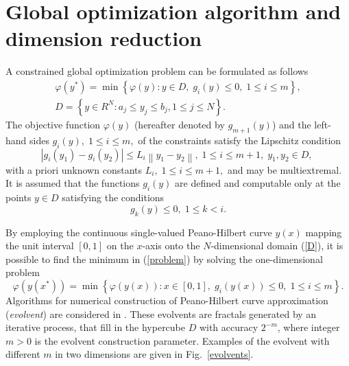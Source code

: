 \documentclass[runningheads]{llncs}
\begin{document}
\section{Global optimization algorithm and dimension reduction}

A constrained global optimization problem can be formulated as follows
\begin{gather}\label{problem}
\varphi(y^\ast)=\min{\left\{\varphi(y):y\in D, \; g_i(y)\leq 0, \; 1 \leq i \leq m\right\}},\\
D=\left\{y\in R^N: a_j\leq y_j \leq b_j, 1\leq j \leq N \right\}.\label{D}
\end{gather}
The objective function $\varphi(y)$ (hereafter denoted by $g_{m+1}(y)$) and the left-hand
sides $g_i(y), \; 1\leq i \leq m,$ of the constraints satisfy the Lipschitz condition
\[
\left|g_i(y_1)-g_i(y_2)\right|\leq L_i\left\|y_1-y_2\right\|, \;1\leq i\leq m+1, \; y_1,y_2 \in D,\;
\]
with a priori unknown constants $L_i, \; 1 \leq i \leq m+1,$ and may be multiextremal. It is
assumed that the functions $g_i(y)$ are defined and computable only at the points $y \in D$
satisfying the conditions
\begin{equation}\label{g_k}
g_k(y) \leq 0, \; 1 \leq k < i.
\end{equation}

By employing the continuous single-valued Peano-Hilbert curve $y(x)$ mapping the unit
interval
$[0,1]$ on the $x$-axis onto the $N$-dimensional domain (\ref{D}), it is possible to find the
minimum in (\ref{problem}) by solving the one-dimensional problem
\[
\varphi(y(x^\ast))=\min \left\{\varphi(y(x)): x \in [0,1], \; g_i(y(x))\leq 0, \; 1 \leq i \leq m\right\}.
\]
Algorithms for numerical construction of Peano-Hilbert curve approximation (\textit{evolvent}) are
considered in \cite{Strongin2000,Strongin2013}. These evolvents are fractals generated by an iterative
process, that fill in the hypercube $D$ with accuracy $2^{-m}$, where integer $m>0$ is the
evolvent construction parameter. Examples of the evolvent with different $m$ in two dimensions are given in Fig.~\ref{evolvents}.
\end{document}
